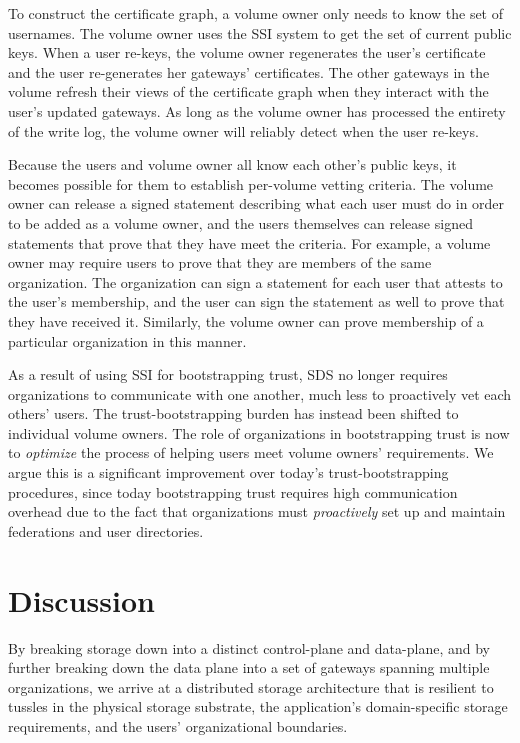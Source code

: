 To construct the certificate graph, a volume owner only needs to know the set of
usernames.  The volume owner uses the SSI system to get the set of current
public keys.  When a user re-keys, the volume owner regenerates the user's
certificate and the user re-generates her gateways' certificates.  The other
gateways in the volume refresh their views of the certificate graph when they
interact with the user's updated gateways.  As long as the volume owner has
processed the entirety of the write log, the volume owner will reliably detect
when the user re-keys.

Because the users and volume owner all know each other's public keys, it becomes
possible for them to establish per-volume vetting criteria.  The volume owner
can release a signed statement describing what each user must do in order to be
added as a volume owner, and the users themselves can release signed statements
that prove that they have meet the criteria.  For example, a volume owner may
require users to prove that they are members of the same organization.  The
organization can sign a statement for each user that attests to the user's
membership, and the user can sign the statement as well to prove that they have
received it.  Similarly, the volume owner can prove membership of a particular
organization in this manner.

As a result of using SSI for bootstrapping trust, SDS no longer requires
organizations to communicate with one another, much less to proactively vet each
others' users.  The trust-bootstrapping burden has instead been shifted to individual volume owners.
The role of organizations in bootstrapping trust is now to \emph{optimize} the
process of helping users meet volume owners' requirements.  We argue this is a
significant improvement over today's trust-bootstrapping procedures, since today
bootstrapping trust requires high communication overhead due to the fact that
organizations must \emph{proactively} set up and maintain federations and user
directories.

\section{Discussion}

By breaking storage down into a distinct control-plane and data-plane, and by
further breaking down the data plane into a set of gateways spanning multiple
organizations, we arrive at a distributed storage architecture that is resilient
to tussles in the physical storage substrate, the application's
domain-specific storage requirements, and the users' organizational boundaries.

